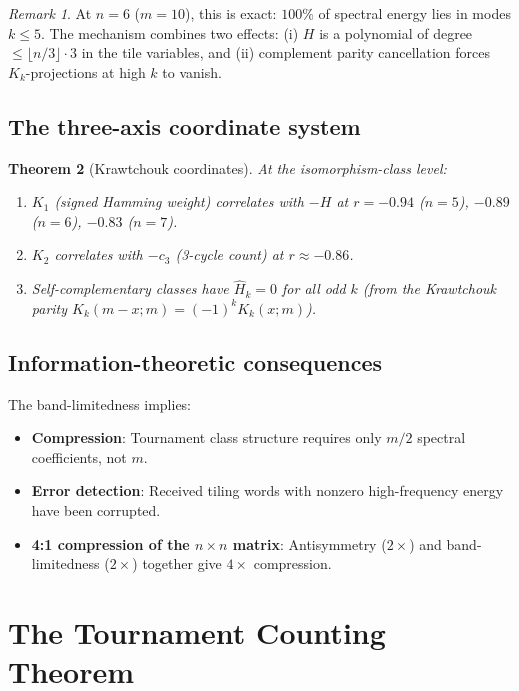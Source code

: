 \documentclass[11pt,a4paper]{article}
\newtheorem{theorem}{Theorem}[section]
\theoremstyle{definition}
\theoremstyle{remark}
\newtheorem{remark}[theorem]{Remark}
\begin{document}
\begin{remark}
At $n = 6$ ($m = 10$), this is exact: $100\%$ of spectral energy lies in modes $k \leq 5$. The mechanism combines two effects: (i) $H$ is a polynomial of degree $\leq \lfloor n/3 \rfloor \cdot 3$ in the tile variables, and (ii) complement parity cancellation forces $K_k$-projections at high $k$ to vanish.
\end{remark}

\subsection{The three-axis coordinate system}

\begin{theorem}[Krawtchouk coordinates]
\label{thm:coordinates}
At the isomorphism-class level:
\begin{enumerate}
\item $K_1$ (signed Hamming weight) correlates with $-H$ at $r = -0.94$ ($n=5$), $-0.89$ ($n=6$), $-0.83$ ($n=7$).
\item $K_2$ correlates with $-c_3$ (3-cycle count) at $r \approx -0.86$.
\item Self-complementary classes have $\hat{H}_k = 0$ for all odd $k$ (from the Krawtchouk parity $K_k(m{-}x; m) = (-1)^k K_k(x; m)$).
\end{enumerate}
\end{theorem}

\subsection{Information-theoretic consequences}

The band-limitedness implies:
\begin{itemize}
\item \textbf{Compression}: Tournament class structure requires only $m/2$ spectral coefficients, not $m$.
\item \textbf{Error detection}: Received tiling words with nonzero high-frequency energy have been corrupted.
\item \textbf{4:1 compression of the $n \times n$ matrix}: Antisymmetry ($2\times$) and band-limitedness ($2\times$) together give $4\times$ compression.
\end{itemize}

\section{The Tournament Counting Theorem}
\label{sec:euler}
\end{document}
